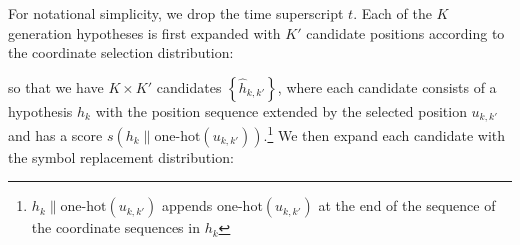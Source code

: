 \documentclass{article}
\begin{document}
For notational simplicity, we drop the time superscript $t$.
Each of the $K$ generation hypotheses is first expanded with $K'$ candidate positions according to the coordinate selection distribution: 
\iffalse
\begin{align*}
&\left\{ \hat{h}_{k,k'} \right\}_{k'=1}^{K'} =\\
&= \text{arg~top-$K'$}_{u \in \{1, \dots, L\} } 
\underbrace{s(h_k) + \log p(z_{k, u} = 1| \hat{Y}^{< t}, \hat{Z}^{t-1}, X)}_{
=s(h_k \| \text{one-hot}(u) )}
\end{align*}
\fi
so that we have $K \times K'$ candidates $\left\{ \hat{h}_{k,k'} \right\}$, where each candidate consists of a hypothesis $h_k$ with the position sequence extended by the selected position 
$u_{k,k'}$
and has a score 
$s(h_k \| \text{one-hot}(u_{k,k'}))$.\footnote{
$h_k \| \text{one-hot}(u_{k,k'})$ appends $\text{one-hot}(u_{k,k'})$ at the end of the sequence of the coordinate sequences in $h_{k}$
}
We then expand each candidate with the symbol replacement distribution:
\end{document}
